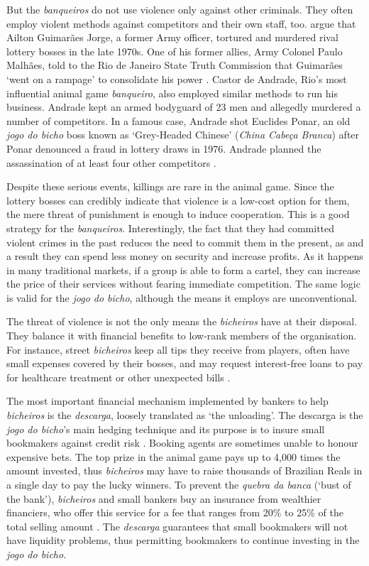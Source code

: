 \documentclass[a4paper,12pt]{article}
\begin{document}
But the \textit{banqueiros} do not use violence only against other criminals. They often employ violent methods against competitors and their own staff, too. \citet{jupiara2015poroes} argue that Ailton Guimarães Jorge, a former Army officer, tortured and murdered rival lottery bosses in the late 1970s. One of his former allies, Army Colonel Paulo Malhães, told to the Rio de Janeiro State Truth Commission that Guimarães `went on a rampage' to consolidate his power \citep{belem2015guimaraes}. Castor de Andrade, Rio's most influential animal game \textit{banqueiro}, also employed similar methods to run his business. Andrade kept an armed bodyguard of 23 men and allegedly murdered a number of competitors. In a famous case, Andrade shot Euclides Ponar, an old \textit{jogo do bicho} boss known as `Grey-Headed Chinese' (\textit{China Cabe\c{c}a Branca}) after Ponar denounced a fraud in lottery draws in 1976. Andrade planned the assassination of at least four other competitors \citep{globo2017castor}. 

Despite these serious events, killings are rare in the animal game. Since the lottery bosses can credibly indicate that violence is a low-cost option for them, the mere threat of punishment is enough to induce cooperation. This is a good strategy for the \textit{banqueiros}. Interestingly, the fact that they had committed violent crimes in the past reduces the need to commit them in the present, as and a result they can spend less money on security and increase profits. As it happens in many traditional markets, if a group is able to form a cartel, they can increase the price of their services without fearing immediate competition. The same logic is valid for the \textit{jogo do bicho}, although the means it employs are unconventional.  

The threat of violence is not the only means the \textit{bicheiros} have at their disposal. They balance it with financial benefits to low-rank members of the organisation. For instance, street \emph{bicheiros} keep all tips they receive from players, often have small expenses covered by their bosses, and may request interest-free loans to pay for healthcare treatment or other unexpected bills \citep{labronici2012paratodos}.

The most important financial mechanism implemented by bankers to help \emph{bicheiros} is the \emph{descarga}, loosely translated as `the unloading'. The descarga is the \emph{jogo do bicho}'s main hedging technique and its purpose is to insure small bookmakers against credit risk \citetext{\citealp[59]{labronici2012paratodos}; \citealp[178]{magalhaes2005ganhou}}. Booking agents are sometimes unable to honour expensive bets. The top prize in the animal game pays up to 4,000 times the amount invested, thus \emph{bicheiros} may have to raise thousands of Brazilian Reals in a single day to pay the lucky winners. To prevent the \emph{quebra da banca} (`bust of the bank'), \emph{bicheiros} and small bankers buy an insurance from wealthier financiers, who offer this service for a fee that ranges from 20\% to 25\% of the total selling amount \citep{fsp2006descarga}. The \emph{descarga} guarantees that small bookmakers will not have liquidity problems, thus permitting bookmakers to continue investing in the \emph{jogo do bicho}.
\end{document}
